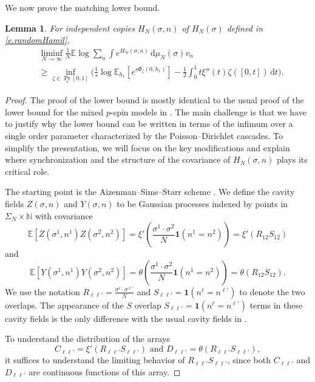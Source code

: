 \documentclass[11pt]{amsart}
\newtheorem{lemma}[proposition]{Lemma}
\theoremstyle{remark}
\theoremstyle{definition}
\numberwithin{equation}{section}
\numberwithin{proposition}{section}
\numberwithin{figure}{section}
\numberwithin{table}{section}
\newcommand{\N}{\mathbb{N}}
\newcommand{\E}{\mathbb{E}}
\renewcommand{\geq}{\geqslant}
\newcommand{\Ll}{\left}
\newcommand{\Rr}{\right}
\renewcommand{\d}{\mathrm{d}}
\newcommand{\1}{\mathbf{1}}
\begin{document}
We now prove the matching lower bound.
\begin{lemma}\label{l.LOBDFE}For independent copies $H_N(\sigma,n)$ of $H_N(\sigma)$ defined in 
\eqref{e.randomHamil},
\begin{align*}
&\liminf_{N \to \infty} \frac{1}{N} \E \log \sum_{n}   \int e^{H_N(\sigma,n)} \, \d\mu_N(\sigma) v_n 
\\&\geq \inf_{\zeta \in \Pr_s[0,1]}\bigg(  \frac 1 s \log \E_{h_1} \Ll[ e^{s \Phi_\zeta(0,h_1)} \Rr] - \frac{1}{2} \int_0^1 t \xi''(t) \zeta([0,t]) \, \d t \bigg)    .
\end{align*}
\end{lemma}
\begin{proof}
The proof of the lower bound is mostly identical to the usual proof of the lower bound for the mixed $p$-spin models in \cite[Chapter~3]{pan}. The main challenge is that we have to justify why the lower bound can be written in terms of the infimum over a single order parameter characterized by the Poisson--Dirichlet cascades.  To simplify the presentation, we will focus on the key modifications and explain where synchronization \cite{pan.multi} and the structure of the covariance of $H_N(\sigma,n)$ plays its critical role. 

The starting point is the Aizenman--Sims--Starr scheme \cite{AS2}. We define the cavity fields $Z(\sigma,n)$ and $Y(\sigma,n)$ to be Gaussian processes indexed by points in $\Sigma_N \times \N$ with covariance
\[
\E \Ll[ Z(\sigma^1,n^1) Z(\sigma^2,n^2) \Rr] = \xi'\Ll(\frac{\sigma^1\cdot\sigma^2}{N} \1(n^1 = n^2) \Rr)  = \xi'(R_{12}S_{12}) 
\]
and
\[
\E \Ll[ Y(\sigma^1,n^1) Y(\sigma^2,n^2) \Rr] = \theta\Ll(\frac{\sigma^1\cdot\sigma^2}{N} \1(n^1 = n^2) \Rr)  = \theta(R_{12}S_{12}).
\]
We use the notation $R_{\ell\ell'} = \frac{\sigma^\ell\cdot\sigma^{\ell'}}{N}$ and $S_{\ell\ell'} = \1(n^\ell = n^{\ell'})$ to denote the two overlaps.  The appearance of the $S$ overlap $S_{\ell\ell'} = \1(n^\ell = n^{\ell'})$ terms in these cavity fields is the only difference with the usual cavity fields in \cite[Equation~3.60]{pan}. 

To understand the distribution of the arrays 
\[
C_{\ell\ell'} = \xi'(R_{\ell \ell'} S_{\ell\ell'}) \text{ and } D_{\ell\ell'} = \theta(R_{\ell \ell'} S_{\ell\ell'}) ,
\]
it suffices to understand the limiting behavior of $R_{\ell \ell'} S_{\ell\ell'}$, since both $C_{\ell\ell'}$ and $D_{\ell\ell'}$ are continuous functions of this array.


\end{proof}
\end{document}
